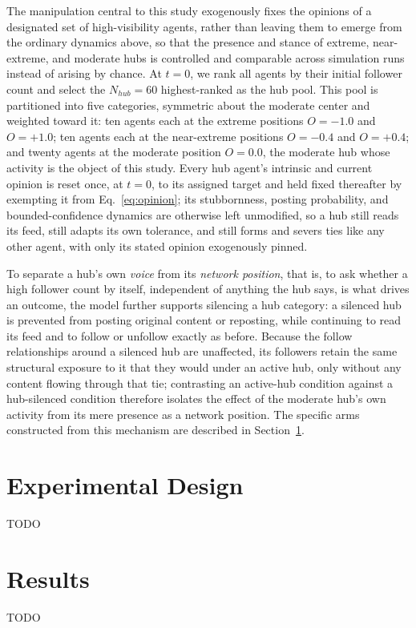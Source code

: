 \documentclass{svproc}
\begin{document}
The manipulation central to this study exogenously fixes the opinions of a designated set of high-visibility agents, rather than leaving them to emerge from the ordinary dynamics above, so that the presence and stance of extreme, near-extreme, and moderate hubs is controlled and comparable across simulation runs instead of arising by chance. At $t=0$, we rank all agents by their initial follower count and select the $N_{hub}=60$ highest-ranked as the hub pool. This pool is partitioned into five categories, symmetric about the moderate center and weighted toward it: ten agents each at the extreme positions $O=-1.0$ and $O=+1.0$; ten agents each at the near-extreme positions $O=-0.4$ and $O=+0.4$; and twenty agents at the moderate position $O=0.0$, the moderate hub whose activity is the object of this study. Every hub agent's intrinsic and current opinion is reset once, at $t=0$, to its assigned target and held fixed thereafter by exempting it from Eq.~\eqref{eq:opinion}; its stubbornness, posting probability, and bounded-confidence dynamics are otherwise left unmodified, so a hub still reads its feed, still adapts its own tolerance, and still forms and severs ties like any other agent, with only its stated opinion exogenously pinned.

To separate a hub's own \emph{voice} from its \emph{network position}, that is, to ask whether a high follower count by itself, independent of anything the hub says, is what drives an outcome, the model further supports silencing a hub category: a silenced hub is prevented from posting original content or reposting, while continuing to read its feed and to follow or unfollow exactly as before. Because the follow relationships around a silenced hub are unaffected, its followers retain the same structural exposure to it that they would under an active hub, only without any content flowing through that tie; contrasting an active-hub condition against a hub-silenced condition therefore isolates the effect of the moderate hub's own activity from its mere presence as a network position. The specific arms constructed from this mechanism are described in Section~\ref{sec:experiments}.

\section{Experimental Design}\label{sec:experiments}
TODO

\section{Results}\label{sec:results}
TODO
\end{document}
